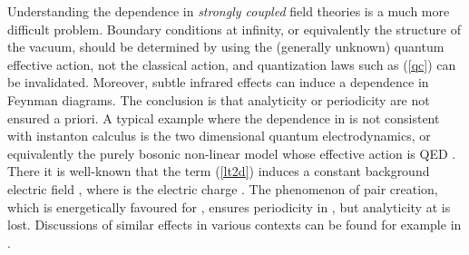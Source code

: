 \documentclass[a4paper,12pt]{article}
\def\cpN{{\mathbb C}P^{N}}
\begin{document}
Understanding the \myHighlight{$\theta$}\coordHE{} dependence in {\it strongly coupled} field 
theories is a much more difficult problem. Boundary conditions at infinity, 
or equivalently the structure of the vacuum, should be determined by using 
the (generally unknown)
quantum effective action, not the classical action, and quantization 
laws such as (\ref{qc}) can be invalidated. Moreover, subtle infrared 
effects can induce a \myHighlight{$\theta$}\coordHE{} dependence in Feynman diagrams. The 
conclusion is that analyticity or \myHighlight{$2\pi$}\coordHE{} periodicity are not ensured
a priori. A typical example where the dependence in
\myHighlight{$\theta$}\coordHE{} is not consistent with instanton calculus
is the two dimensional quantum electrodynamics,
or equivalently the purely bosonic \myHighlight{$\cpN$}\coordHE{} non-linear
\myHighlight{$\sigma$}\coordHE{} model whose effective action is QED\coordHE{} \cite{adda}. There it is 
well-known that the term (\ref{lt2d}) induces a constant
background electric field \coordHE{}, where \coordHE{} is the electric 
charge \cite{coleman}. The phenomenon of pair creation, which is 
energetically favoured for \coordHE{}, ensures \myHighlight{$2\pi$}\coordHE{} periodicity in 
\myHighlight{$\theta$}\coordHE{}, but analyticity at \myHighlight{$\theta=\pm\pi$}\coordHE{} is lost. Discussions of 
similar effects in various contexts can be found for example in
\cite{added}.
\end{document}
